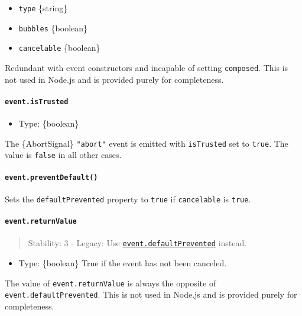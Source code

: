 \begin{itemize}
\tightlist
\item
  \texttt{type} \{string\}
\item
  \texttt{bubbles} \{boolean\}
\item
  \texttt{cancelable} \{boolean\}
\end{itemize}

Redundant with event constructors and incapable of setting
\texttt{composed}. This is not used in Node.js and is provided purely
for completeness.

\paragraph{\texorpdfstring{\texttt{event.isTrusted}}{event.isTrusted}}\label{event.istrusted}

\begin{itemize}
\tightlist
\item
  Type: \{boolean\}
\end{itemize}

The \{AbortSignal\} \texttt{"abort"} event is emitted with
\texttt{isTrusted} set to \texttt{true}. The value is \texttt{false} in
all other cases.

\paragraph{\texorpdfstring{\texttt{event.preventDefault()}}{event.preventDefault()}}\label{event.preventdefault}

Sets the \texttt{defaultPrevented} property to \texttt{true} if
\texttt{cancelable} is \texttt{true}.

\paragraph{\texorpdfstring{\texttt{event.returnValue}}{event.returnValue}}\label{event.returnvalue}

\begin{quote}
Stability: 3 - Legacy: Use
\hyperref[eventdefaultprevented]{\texttt{event.defaultPrevented}}
instead.
\end{quote}

\begin{itemize}
\tightlist
\item
  Type: \{boolean\} True if the event has not been canceled.
\end{itemize}

The value of \texttt{event.returnValue} is always the opposite of
\texttt{event.defaultPrevented}. This is not used in Node.js and is
provided purely for completeness.

